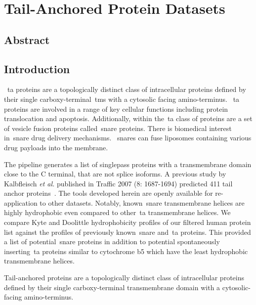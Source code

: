 \chapter{Tail-Anchored Protein Datasets}
\sloppy
\section{Abstract}

\section{Introduction}

~\gls{ta} proteins are a topologically distinct class of intracellular proteins defined by their single carboxy-terminal~\gls{tms} with a cytosolic facing amino-terminus.
~\gls{ta} proteins are involved in a range of key cellular functions including protein translocation and apoptosis.
Additionally, within the~\gls{ta} class of proteins are a set of vesicle fusion proteins called~\gls{snare} proteins.
There is biomedical interest in~\gls{snare} drug delivery mechanisms.
~\gls{snare}s can fuse liposomes containing various drug payloads into the membrane.

The pipeline generates a list of singlepass proteins with a transmembrane domain close to the C terminal, that are not splice isoforms.
A previous study by Kalbfleisch \textit{et al.} published in Traffic 2007 (8: 1687-1694) predicted 411 tail anchor proteins~\cite{Kalbfleisch2007}.
The tools developed herein are openly available for re-application to other datasets.
Notably, known~\gls{snare} transmembrane helices are highly hydrophobic even compared to other~\gls{ta} transmembrane helices.
We compare Kyte and Doolittle hydrophobicity profiles of our filtered human protein list against the profiles of previously known~\gls{snare} and~\gls{ta} proteins.
This provided a list of potential~\gls{snare} proteins in addition to potential spontaneously inserting~\gls{ta} proteins similar to cytochrome b5 which have the least hydrophobic transmembrane helices.

Tail-anchored proteins are a topologically distinct class of intracellular proteins defined by their single carboxy-terminal transmembrane domain with a cytosolic-facing amino-terminus.

